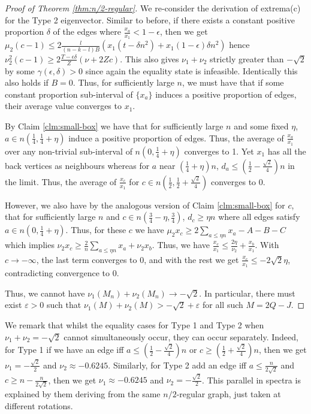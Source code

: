 \documentclass[11pt]{article}
\begin{document}
\begin{proof}[Proof of Theorem \ref{thm:n/2-regular}]
    We re-consider the derivation of extrema(c) for the Type 2 eigenvector. Similar to before, if there exists a constant positive proportion $\delta$ of the edges where $\frac{x_a}{x_1} < 1-\epsilon$, then we get $\mu_2(c-1) \le 2\frac{l}{(n-k-l)B} (x_1(t - \delta n^2) + x_1(1 - \epsilon)\delta n^2)$ hence $\nu_2^2(c-1) \ge 2\frac{T - \epsilon \delta}{Z}(\nu + 2Zc)$. This also gives $\nu_1 + \nu_2$ strictly greater than $-\sqrt{2}$ by some $\gamma(\epsilon, \delta) > 0$ since again the equality state is infeasible. Identically this also holds if $B = 0$. Thus, for sufficiently large $n$, we must have that if some constant proportion sub-interval of $\{x_a\}$ induces a positive proportion of edges, their average value converges to $x_1$. 

    By Claim \ref{clm:small-box} we have that for sufficiently large $n$ and some fixed $\eta$, $a \in n(\frac14, \frac14 + \eta)$ induce a positive proportion of edges. Thus, the average of $\frac{x_a}{x_1}$ over any non-trivial sub-interval of $n(0, \frac14 + \eta)$ converges to 1. Yet $x_1$ has all the back vertices as neighbours whereas for $a$ near $(\frac14 + \eta)n$, $d_a \le (\frac12 - \frac{\sqrt{2}}{4})n$ in the limit. Thus, the average of $\frac{x_c}{x_1}$ for $c \in n(\frac12, \frac12 + \frac{\sqrt{2}}{4})$ converges to 0. 
    
    However, we also have by the analogous version of Claim \ref{clm:small-box} for $c$, that for sufficiently large $n$ and $c \in n(\frac34 - \eta, \frac34)$, $d_c \ge \eta n$ where all edges satisfy $a \in n(0, \frac14 + \eta)$. Thus, for these $c$ we have $\mu_2 x_c \ge 2\sum_{a \le \eta n} x_a - A - B - C$ which implies $\nu_2 x_c \ge \frac{2}{n} \sum_{a \le \eta n} x_a + \nu_2 x_b$. Thus, we have $\frac{x_c}{x_1} \le \frac{2\eta}{\nu_2} + \frac{x_b}{x_1}$. With $c \to -\infty$, the last term converges to 0, and with the rest we get $\frac{x_c}{x_1} \le -2\sqrt{2} \eta$, contradicting convergence to 0. 

    Thus, we cannot have $\nu_1(M_n) + \nu_2(M_n) \to -\sqrt{2}$. In particular, there must exist $\varepsilon > 0$ such that $\nu_1(M) + \nu_2(M) > -\sqrt{2} + \varepsilon$ for all such $M = 2Q-J$. 
\end{proof}

We remark that whilst the equality cases for Type 1 and Type 2 when $\nu_1 + \nu_2 = -\sqrt{2}$ cannot simultaneously occur, they can occur separately. Indeed, for Type 1 if we have an edge iff $a \le (\frac12 - \frac{\sqrt{2}}{4})n$ or $c \ge (\frac12 + \frac{\sqrt{2}}{4})n$, then we get $\nu_1 = -\frac{\sqrt{2}}{2}$ and $\nu_2 \approx -0.6245$. Similarly, for Type 2 add an edge iff $a \le \frac{n}{2\sqrt{2}}$ and $c \ge n - \frac{n}{2\sqrt{2}}$, then we get $\nu_1 \approx -0.6245$ and $\nu_2 = -\frac{\sqrt{2}}{2}$. This parallel in spectra is explained by them deriving from the same $n/2$-regular graph, just taken at different rotations.
\end{document}
